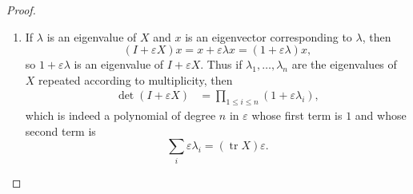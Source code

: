 \documentclass[12pt]{article}
\DeclareMathOperator{\tr}{tr}
\theoremstyle{definition}
\begin{document}
\begin{proof}\
	\begin{enumerate}[label=(\roman*)]
		\item If $\lambda$ is an eigenvalue of $X$ and $x$ is an eigenvector corresponding to $\lambda$, then \begin{equation*}
			      (I+\varepsilon X)x = x + \varepsilon\lambda x = (1+\varepsilon\lambda)x,
		      \end{equation*} so $1 + \varepsilon\lambda$ is an eigenvalue of $I + \varepsilon X$.
		      Thus if $\lambda_1, \dots, \lambda_n$ are the eigenvalues of $X$ repeated according to multiplicity, then \begin{align*}
			      \det(I + \varepsilon X) & = \prod_{1 \leq i \leq n} (1 + \varepsilon\lambda_i),
		      \end{align*}
		      which is indeed a polynomial of degree $n$ in $\varepsilon$ whose first term is $1$ and whose second term is \begin{equation*}
			      \sum_{i}\varepsilon\lambda_i = (\tr X) \varepsilon.
		      \end{equation*}
	\end{enumerate}
\end{proof}
\end{document}
